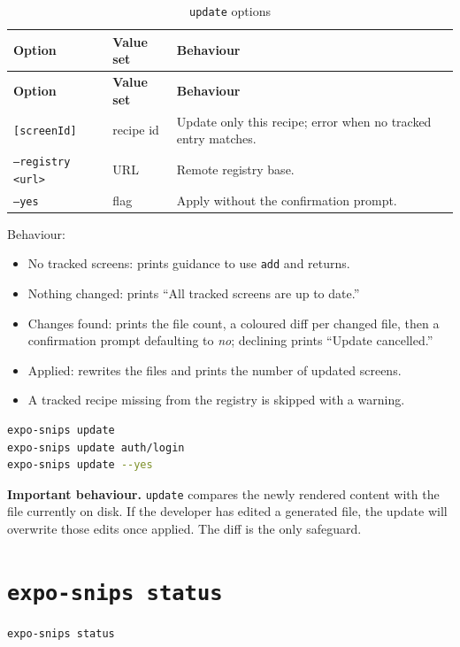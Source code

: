 \begin{longtable}{@{}L{3.4cm}L{2.9cm}L{8.5cm}@{}}
\caption{\texttt{update} options}\\
\toprule
\textbf{Option} & \textbf{Value set} & \textbf{Behaviour} \\
\midrule
\endfirsthead
\toprule
\textbf{Option} & \textbf{Value set} & \textbf{Behaviour} \\
\midrule
\endhead
\texttt{[screenId]} & recipe id & Update only this recipe; error when no tracked
entry matches. \\
\texttt{--registry <url>} & URL & Remote registry base. \\
\texttt{--yes} & flag & Apply without the confirmation prompt. \\
\bottomrule
\end{longtable}

Behaviour:

\begin{itemize}
  \item No tracked screens: prints guidance to use \texttt{add} and returns.
  \item Nothing changed: prints ``All tracked screens are up to date.''
  \item Changes found: prints the file count, a coloured diff per changed file, then
        a confirmation prompt defaulting to \emph{no}; declining prints ``Update
        cancelled.''
  \item Applied: rewrites the files and prints the number of updated screens.
  \item A tracked recipe missing from the registry is skipped with a warning.
\end{itemize}

\begin{lstlisting}[language=bash]
expo-snips update
expo-snips update auth/login
expo-snips update --yes
\end{lstlisting}

\textbf{Important behaviour.} \texttt{update} compares the newly rendered content
with the file currently on disk. If the developer has edited a generated file, the
update will overwrite those edits once applied. The diff is the only safeguard.

\section{\texttt{expo-snips status}}

\begin{lstlisting}[language=bash]
expo-snips status
\end{lstlisting}

